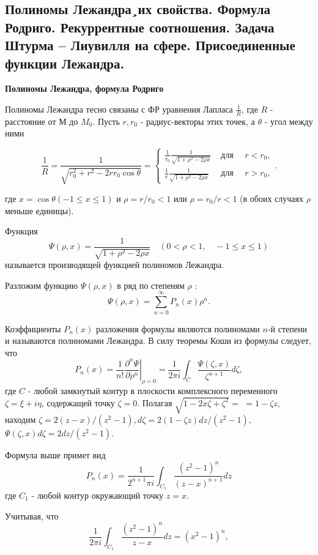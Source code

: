 \subsection{Полиномы Лежандра¸их свойства. Формула Родриго. Рекуррентные соотношения. Задача Штурма – Лиувилля на сфере. Присоединенные функции Лежандра.}



\textbf{Полиномы Лежандра, формула Родриго}

Полиномы Лежандра тесно связаны с ФР уравнения Лапласа $\frac{1}{R}$, где $R$ - расстояние от $М$ до $M_0$. Пусть $r, r_0$ - радиус-векторы этих точек, а $\theta$ - угол между ними

\[
\frac{1}{R}=\frac{1}{\sqrt{r_{0}^{2}+r^{2}-2 r r_{0} \cos \theta}}=\begin{cases}
	\frac{1}{r_{0}} \frac{1}{\sqrt{1+\rho^{2}-2 \rho x}} & \text { для } \quad r<r_{0}, \\
	\frac{1}{r} \frac{1}{\sqrt{1+\rho^{2}-2 \rho x}} & \text { для } \quad r>r_{0},
\end{cases}.
\]

где $x=\cos \theta(-1 \leq x \leq 1)$ и $\rho=r / r_{0}<1$ или $\rho=r_{0} / r<1$ (в обоих случаях $\rho$ меньше единицы).

Функция
\[
\Psi(\rho, x)=\frac{1}{\sqrt{1+\rho^{2}-2 \rho x}} \quad(0<\rho<1, \quad-1 \leq x \leq 1)
\]
называется производящей функцией полиномов Лежандра.

Разложим функцию $\Psi(\rho, x)$ в ряд по степеням $\rho$ :
\[
\Psi(\rho, x)=\sum_{n=0}^{\infty} P_{n}(x) \rho^{n} .
\]

Коэффициенты $P_{n}(x)$ разложения формулы являются полиномами $n$-й степени и называются полиномами Лежандра.
В силу теоремы Коши из формулы следует, что
\[
P_{n}(x)=\left.\frac{1}{n !} \frac{\partial^{n} \Psi}{\partial \rho^{n}}\right|_{\rho=0}=\frac{1}{2 \pi i} \int_{C} \frac{\Psi(\zeta, x)}{\zeta^{n+1}} d \zeta,
\]
где $C$ - любой замкнутый контур в плоскости комплексного переменного $\zeta=\xi+i \eta$, содержащей точку $\zeta=0$. Полагая $\sqrt{1-2 x \zeta+\zeta^{2}}=$ $=1-\zeta z$, находим $\zeta=2(z-x) /\left(z^{2}-1\right), d \zeta=2(1-\zeta z) d z /\left(z^{2}-1\right)$, $\Psi(\zeta, x) d \zeta=2 d z /\left(z^{2}-1\right)$.

Формула выше примет вид
\[
P_{n}(x)=\frac{1}{2^{n+1} \pi i} \int_{C_{1}} \frac{\left(z^{2}-1\right)^{n}}{(z-x)^{n+1}} d z
\]
где $C_1$ - любой контур окружающий точку $z = x$.

Учитывая, что
\[
\frac{1}{2 \pi i} \int_{C_{1}} \frac{\left(z^{2}-1\right)^{n}}{z-x} d z=\left(x^{2}-1\right)^{n},
\]

